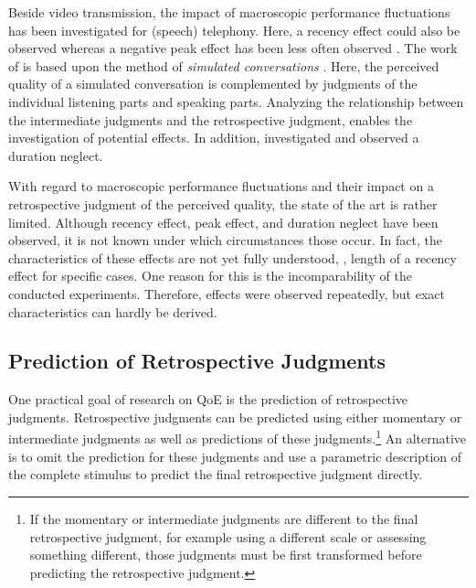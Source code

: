 Beside video transmission, the impact of macroscopic performance fluctuations has been investigated for (speech) telephony. %
Here, a recency effect could also be observed \citep[\eg,][]{rosenbluth_testing_1998, hamberg_time-varying_1999, gros_instantaneous_2001, gros_effects_2004, belmudez_audiovisual_2015, weiss_modeling_2009, lewcio_management_2014} whereas a negative peak effect has been less often observed \citep[\eg,][]{weiss_modeling_2009, belmudez_audiovisual_2015, lewcio_management_2014}.
The work of \citet{weiss_modeling_2009, lewcio_management_2014, belmudez_audiovisual_2015} is based upon the method of \emph{simulated conversations} \citep{etsi_speech_2011}.
Here, the perceived quality of a simulated conversation is complemented by judgments of the individual listening parts and speaking parts.
Analyzing the relationship between the intermediate judgments and the retrospective judgment, enables the investigation of potential effects.
In addition, \citet{rosenbluth_testing_1998} investigated and observed a duration neglect.

With regard to macroscopic performance fluctuations and their impact on a retrospective judgment of the perceived quality, the state of the art is rather limited.
Although recency effect, peak effect, and duration neglect have been observed, it is not known under which circumstances those occur.
In fact, the characteristics of these effects are not yet fully understood, \eg, length of a recency effect for specific cases.
One reason for this is the incomparability of the conducted experiments.
Therefore, effects were observed repeatedly, but exact characteristics can hardly be derived.

\subsection{Prediction of Retrospective Judgments}
One practical goal of research on \ac{QoE} is the prediction of retrospective judgments.
Retrospective judgments can be predicted using either momentary or intermediate judgments as well as predictions of these judgments.\footnote{If the momentary or intermediate judgments are different to the final retrospective judgment, for example using a different scale or assessing something different, those judgments must be first transformed before predicting the retrospective judgment.}
An alternative is to omit the prediction for these judgments and use a parametric description of the complete stimulus to predict the final retrospective judgment directly.

